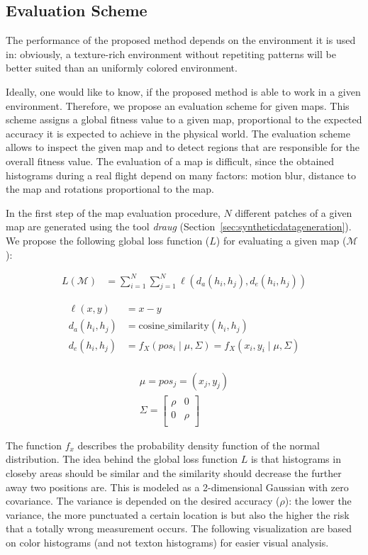 \subsection{Evaluation Scheme}
\label{sec:evaluationscheme}

The performance of the proposed method depends
on the environment it is used in: obviously, a texture-rich environment without repetiting patterns will be better suited than an uniformly colored environment. 

Ideally, one would like to know, if the proposed method is able to work in a given environment. Therefore, we propose an evaluation scheme for given
maps. This scheme assigns a global fitness value to a given map,
proportional to the expected accuracy it is expected to achieve in the physical
world. The evaluation scheme allows to inspect the given map and to detect
regions that are responsible for the overall fitness value. The evaluation of a map is
difficult, since the obtained histograms during a real flight depend
on many factors: motion blur, distance to the map and rotations
proportional to the map.

In the first step of the map evaluation procedure, $N$ different
patches of a given map are generated using the tool \emph{draug}
(Section~\ref{sec:syntheticdatageneration}). We propose the following global loss function
($L$) for evaluating a given map ($\mathcal{M}$):

\begin{align}
  L(\mathcal{M}) &= \sum_{i = 1}^{N} \sum_{j = 1}^{N} \ell(d_a(h_i, h_j), d_e(h_i, h_j))
\end{align}

\begin{align}
  \ell(x, y) &= x - y\\
  d_a(h_i, h_j) &= \text{cosine\_similarity}(h_i, h_j)\\
  d_e(h_i, h_j) &= f_X(pos_i \mid \mu, \Sigma) = f_X(x_i, y_i \mid \mu, \Sigma)\\
\end{align}

\begin{align}
\mu = pos_j = (x_j, y_j)\\
\Sigma =
  \begin{bmatrix}
    \rho & 0\\
    0 & \rho\\
  \end{bmatrix}
\end{align}

The function $f_x$ describes the probability density function of the normal distribution. The idea behind the global loss function $L$ is that histograms in closeby areas
should be similar and the similarity should decrease the further away
two positions are. This is modeled as a 2-dimensional Gaussian with zero
covariance. The variance is depended on the
desired accuracy ($\rho$): the lower the variance, the more punctuated
a certain location is but also the higher the risk that a totally
wrong measurement occurs. The following visualization are based on
color histograms (and not texton histograms) for easier visual
analysis.
